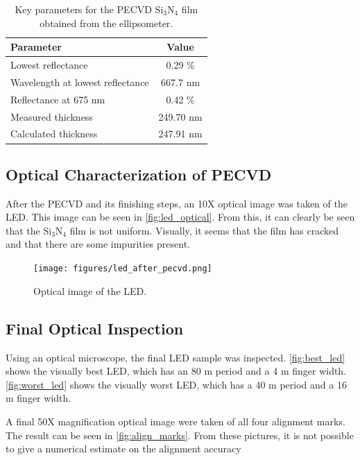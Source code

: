\begin{table}
    \centering
    \caption{Key parameters for the PECVD Si$_3$N$_4$ film obtained from the ellipsometer.}
    \label{tab:pecvd_ellipsometer}
    \begin{tabular}{lc}
    \hline
    \textbf{Parameter}               & \textbf{Value} \\ \hline
    Lowest reflectance               & 0.29 \%        \\
    Wavelength at lowest reflectance & 667.7 nm       \\
    Reflectance at 675 nm            &  0.42 \%       \\
    Measured thickness               & 249.70 nm      \\
    Calculated thickness             & 247.91 nm      \\ \hline
    \end{tabular}
\end{table}


\subsection{Optical Characterization of PECVD}

After the PECVD and its finishing steps, an 10X optical image was taken of the LED.
This image can be seen in \autoref{fig:led_optical}.
From this, it can clearly be seen that the Si$_3$N$_4$ film is not uniform.
Visually, it seems that the film has cracked and that there are some impurities present.

\begin{figure}
    \centering
    \texttt{[image: figures/led\_after\_pecvd.png]}
    \caption{Optical image of the LED.}
    \label{fig:led_optical}
\end{figure}


\subsection{Final Optical Inspection}

Using an optical microscope, the final LED sample was inspected.
\autoref{fig:best_led} shows the visually best LED, which has an 80 \textmu m period and a 4 \textmu m finger width.
\autoref{fig:worst_led} shows the visually worst LED, which has a 40 \textmu m period and a 16 \textmu m finger width.

A final 50X magnification optical image were taken of all four alignment marks.
The result can be seen in \autoref{fig:align_marks}.
From these pictures, it is not possible to give a numerical estimate on the alignment accuracy


